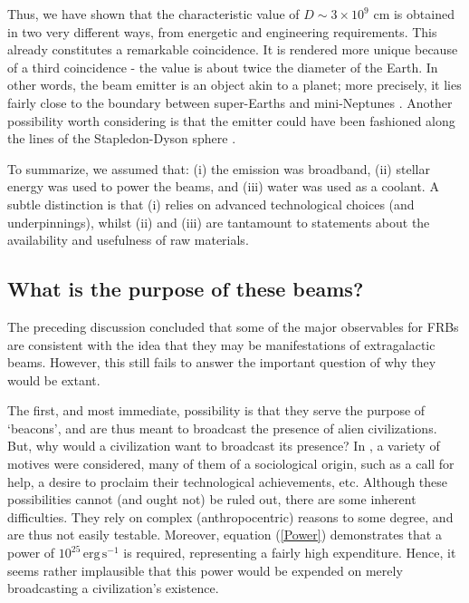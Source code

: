 \documentclass[twocolumn,tighten]{aastex61}
\begin{document}
Thus, we have shown that the characteristic value of $D \sim 3\times10^9$ cm is obtained in two very different ways, from energetic and engineering requirements. This already constitutes a remarkable coincidence. It is rendered more unique because of a third coincidence - the value is about twice the diameter of the Earth. In other words, the beam emitter is an object akin to a planet; more precisely, it lies fairly close to the boundary between super-Earths and mini-Neptunes \citep{Rog15}. Another possibility worth considering is that the emitter could have been fashioned along the lines of the Stapledon-Dyson sphere \citep{Stap37,Dys60}.

To summarize, we assumed that: (i) the emission was broadband, (ii) stellar energy was used to power the beams, and (iii) water was used as a coolant. A subtle distinction is that (i) relies on advanced technological choices (and underpinnings), whilst (ii) and (iii) are tantamount to statements about the availability and usefulness of raw materials.

\subsection{What is the purpose of these beams?}
The preceding discussion concluded that some of the major observables for FRBs are consistent with the idea that they may be manifestations of extragalactic beams. However, this still fails to answer the important question of why they would be extant.

The first, and most immediate, possibility is that they serve the purpose of `beacons', and are thus meant to broadcast the presence of alien civilizations. But, why would a civilization want to broadcast its presence? In \citet{BBB10}, a variety of motives were considered, many of them of a sociological origin, such as a call for help, a desire to proclaim their technological achievements, etc. Although these possibilities cannot (and ought not) be ruled out, there are some inherent difficulties. They rely on complex (anthropocentric) reasons to some degree, and are thus not easily testable. Moreover, equation (\ref{Power}) demonstrates that a power of $10^{25}\,\mathrm{erg\,s^{-1}}$ is required, representing a fairly high expenditure. Hence, it seems rather implausible that this power would be expended on merely broadcasting a civilization's existence.
\end{document}
